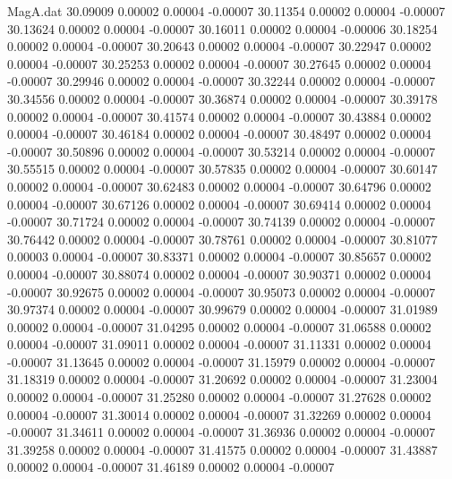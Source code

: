 \begin{filecontents}{MagA.dat}
  30.09009    0.00002    0.00004   -0.00007
  30.11354    0.00002    0.00004   -0.00007
  30.13624    0.00002    0.00004   -0.00007
  30.16011    0.00002    0.00004   -0.00006
  30.18254    0.00002    0.00004   -0.00007
  30.20643    0.00002    0.00004   -0.00007
  30.22947    0.00002    0.00004   -0.00007
  30.25253    0.00002    0.00004   -0.00007
  30.27645    0.00002    0.00004   -0.00007
  30.29946    0.00002    0.00004   -0.00007
  30.32244    0.00002    0.00004   -0.00007
  30.34556    0.00002    0.00004   -0.00007
  30.36874    0.00002    0.00004   -0.00007
  30.39178    0.00002    0.00004   -0.00007
  30.41574    0.00002    0.00004   -0.00007
  30.43884    0.00002    0.00004   -0.00007
  30.46184    0.00002    0.00004   -0.00007
  30.48497    0.00002    0.00004   -0.00007
  30.50896    0.00002    0.00004   -0.00007
  30.53214    0.00002    0.00004   -0.00007
  30.55515    0.00002    0.00004   -0.00007
  30.57835    0.00002    0.00004   -0.00007
  30.60147    0.00002    0.00004   -0.00007
  30.62483    0.00002    0.00004   -0.00007
  30.64796    0.00002    0.00004   -0.00007
  30.67126    0.00002    0.00004   -0.00007
  30.69414    0.00002    0.00004   -0.00007
  30.71724    0.00002    0.00004   -0.00007
  30.74139    0.00002    0.00004   -0.00007
  30.76442    0.00002    0.00004   -0.00007
  30.78761    0.00002    0.00004   -0.00007
  30.81077    0.00003    0.00004   -0.00007
  30.83371    0.00002    0.00004   -0.00007
  30.85657    0.00002    0.00004   -0.00007
  30.88074    0.00002    0.00004   -0.00007
  30.90371    0.00002    0.00004   -0.00007
  30.92675    0.00002    0.00004   -0.00007
  30.95073    0.00002    0.00004   -0.00007
  30.97374    0.00002    0.00004   -0.00007
  30.99679    0.00002    0.00004   -0.00007
  31.01989    0.00002    0.00004   -0.00007
  31.04295    0.00002    0.00004   -0.00007
  31.06588    0.00002    0.00004   -0.00007
  31.09011    0.00002    0.00004   -0.00007
  31.11331    0.00002    0.00004   -0.00007
  31.13645    0.00002    0.00004   -0.00007
  31.15979    0.00002    0.00004   -0.00007
  31.18319    0.00002    0.00004   -0.00007
  31.20692    0.00002    0.00004   -0.00007
  31.23004    0.00002    0.00004   -0.00007
  31.25280    0.00002    0.00004   -0.00007
  31.27628    0.00002    0.00004   -0.00007
  31.30014    0.00002    0.00004   -0.00007
  31.32269    0.00002    0.00004   -0.00007
  31.34611    0.00002    0.00004   -0.00007
  31.36936    0.00002    0.00004   -0.00007
  31.39258    0.00002    0.00004   -0.00007
  31.41575    0.00002    0.00004   -0.00007
  31.43887    0.00002    0.00004   -0.00007
  31.46189    0.00002    0.00004   -0.00007

\end{filecontents}
